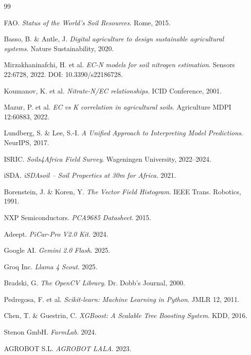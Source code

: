 \documentclass[a4paper,12pt,openany,titlepage]{scrartcl}
\begin{document}
\begin{thebibliography}{99}

 FAO. \textit{Status of the World's Soil Resources}. Rome, 2015.

 Basso, B. \& Antle, J. \textit{Digital agriculture to design sustainable agricultural systems}. Nature Sustainability, 2020.

 Mirzakhaninafchi, H. et al. \textit{EC-N models for soil nitrogen estimation}. Sensors 22:6728, 2022. DOI: 10.3390/s22186728.

 Koumanov, K. et al. \textit{Nitrate-N/EC relationships}. ICID Conference, 2001.

 Mazur, P. et al. \textit{EC vs K correlation in agricultural soils}. Agriculture MDPI 12:60883, 2022.

 Lundberg, S. \& Lee, S.-I. \textit{A Unified Approach to Interpreting Model Predictions}. NeurIPS, 2017.

 ISRIC. \textit{Soils4Africa Field Survey}. Wageningen University, 2022--2024.

 iSDA. \textit{iSDAsoil -- Soil Properties at 30m for Africa}. 2021.

 Borenstein, J. \& Koren, Y. \textit{The Vector Field Histogram}. IEEE Trans. Robotics, 1991.

 NXP Semiconductors. \textit{PCA9685 Datasheet}. 2015.

 Adeept. \textit{PiCar-Pro V2.0 Kit}. 2024.

 Google AI. \textit{Gemini 2.0 Flash}. 2025.

 Groq Inc. \textit{Llama 4 Scout}. 2025.

 Bradski, G. \textit{The OpenCV Library}. Dr. Dobb's Journal, 2000.

 Pedregosa, F. et al. \textit{Scikit-learn: Machine Learning in Python}. JMLR 12, 2011.

 Chen, T. \& Guestrin, C. \textit{XGBoost: A Scalable Tree Boosting System}. KDD, 2016.

 Stenon GmbH. \textit{FarmLab}. 2024.

 AGROBOT S.L. \textit{AGROBOT LALA}. 2023.

\end{thebibliography}
\end{document}
